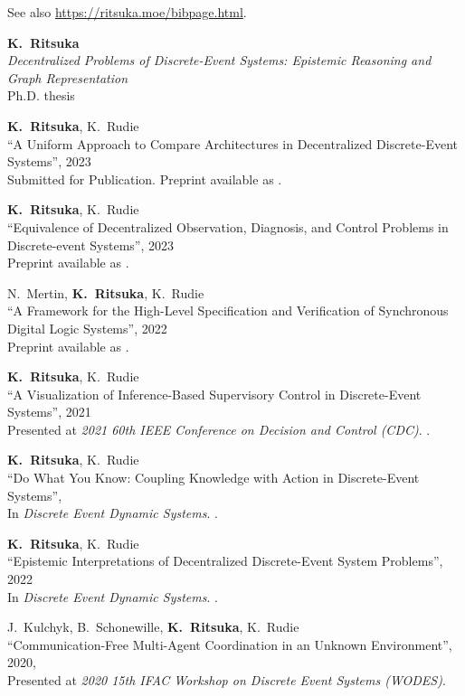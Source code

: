 \documentclass[margin]{res}
\begin{document}
\begin{resume}
See also \url{https://ritsuka.moe/bibpage.html}.

{\bf K.~Ritsuka}\\
\textit{Decentralized Problems of Discrete-Event Systems:
Epistemic Reasoning and Graph Representation}\\
Ph.D. thesis

{\bf K.~Ritsuka}, K.~Rudie\\
``A Uniform Approach to Compare Architectures in Decentralized Discrete-Event Systems'',
2023\\
Submitted for Publication. Preprint available as .

{\bf K.~Ritsuka}, K.~Rudie\\
``Equivalence of Decentralized Observation, Diagnosis, and Control Problems in Discrete-event Systems'',
2023\\
Preprint available as .

N.~Mertin, {\bf K.~Ritsuka}, K.~Rudie\\
``A Framework for the High-Level Specification and Verification of Synchronous Digital Logic Systems'',
2022\\
Preprint available as .

{\bf K.~Ritsuka}, K.~Rudie\\
``A Visualization of Inference-Based Supervisory Control in Discrete-Event Systems'',
2021\\
Presented at \emph{2021 60th IEEE Conference on Decision and Control (CDC)}.
.

{\bf K.~Ritsuka}, K.~Rudie\\
``Do What You Know: Coupling Knowledge with Action in Discrete-Event Systems'',\\
In \emph{Discrete Event Dynamic Systems}.
.

{\bf K.~Ritsuka}, K.~Rudie\\
``Epistemic Interpretations of Decentralized Discrete-Event System Problems'',
2022\\
In \emph{Discrete Event Dynamic Systems}.
.

J.~Kulchyk, B.~Schonewille, {\bf K.~Ritsuka}, K.~Rudie\\
``Communication-Free Multi-Agent Coordination in an Unknown Environment'',
2020,\\
Presented at \emph{2020 15th IFAC Workshop on Discrete Event Systems (WODES)}.


\end{resume}
\end{document}
